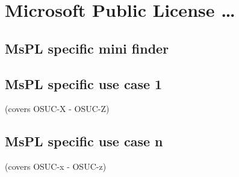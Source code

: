 %
%
%
%
%



\section{Microsoft Public License \ldots}
\label{OSUC-01-MsPL} \label{OSUC-03-MsPL} 
\label{OSUC-06-MsPL} \label{OSUC-09-MsPL}

\label{OSUC-02-MsPL} \label{OSUC-04-MsPL} \label{OSUC-05-MsPL}
\label{OSUC-07-MsPL} \label{OSUC-08-MsPL} \label{OSUC-10-MsPL}

\subsection{MsPL specific mini finder}

\subsection{MsPL specific use case 1}
(covers OSUC-X - OSUC-Z)

\subsection{MsPL specific use case n}
(covers OSUC-x - OSUC-z)


%
